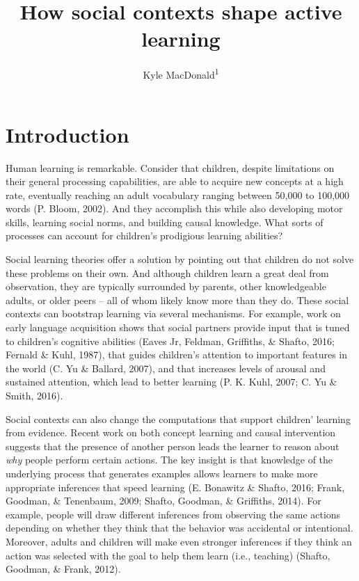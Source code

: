 \documentclass[english,man]{apa6}
\title{How social contexts shape active learning}
\author{Kyle MacDonald\textsuperscript{1}}
\affiliation{
    \vspace{0.5cm}
          \textsuperscript{1} Stanford University  }
\theoremstyle{definition}
\theoremstyle{definition}
\theoremstyle{definition}
\theoremstyle{remark}
\begin{document}
\maketitle

\setcounter{secnumdepth}{0}



\section{Introduction}\label{introduction}

Human learning is remarkable. Consider that children, despite
limitations on their general processing capabilities, are able to
acquire new concepts at a high rate, eventually reaching an adult
vocabulary ranging between 50,000 to 100,000 words (P. Bloom, 2002). And
they accomplish this while also developing motor skills, learning social
norms, and building causal knowledge. What sorts of processes can
account for children's prodigious learning abilities?

Social learning theories offer a solution by pointing out that children
do not solve these problems on their own. And although children learn a
great deal from observation, they are typically surrounded by parents,
other knowledgeable adults, or older peers -- all of whom likely know
more than they do. These social contexts can bootstrap learning via
several mechanisms. For example, work on early language acquisition
shows that social partners provide input that is tuned to children's
cognitive abilities (Eaves Jr, Feldman, Griffiths, \& Shafto, 2016;
Fernald \& Kuhl, 1987), that guides children's attention to important
features in the world (C. Yu \& Ballard, 2007), and that increases
levels of arousal and sustained attention, which lead to better learning
(P. K. Kuhl, 2007; C. Yu \& Smith, 2016).

Social contexts can also change the computations that support children'
learning from evidence. Recent work on both concept learning and causal
intervention suggests that the presence of another person leads the
learner to reason about \emph{why} people perform certain actions. The
key insight is that knowledge of the underlying process that generates
examples allows learners to make more appropriate inferences that speed
learning (E. Bonawitz \& Shafto, 2016; Frank, Goodman, \& Tenenbaum,
2009; Shafto, Goodman, \& Griffiths, 2014). For example, people will
draw different inferences from observing the same actions depending on
whether they think that the behavior was accidental or intentional.
Moreover, adults and children will make even stronger inferences if they
think an action was selected with the goal to help them learn (i.e.,
teaching) (Shafto, Goodman, \& Frank, 2012).
\end{document}
